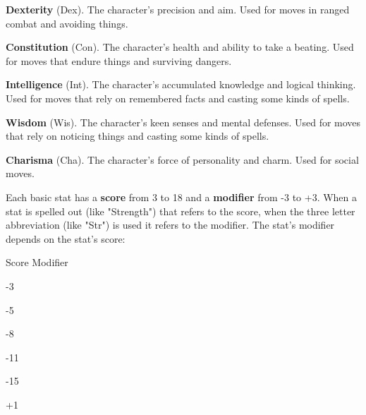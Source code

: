  

{\bf Dexterity}  (Dex). The character's precision and aim. Used for moves in ranged combat and avoiding things.

 

{\bf Constitution}  (Con). The character's health and ability to take a beating. Used for moves that endure things and surviving dangers.

 

{\bf Intelligence}  (Int). The character's accumulated knowledge and logical thinking. Used for moves that rely on remembered facts and casting some kinds of spells.

 

{\bf Wisdom}  (Wis). The character's keen senses and mental defenses. Used for moves that rely on noticing things and casting some kinds of spells.

 

{\bf Charisma}  (Cha). The character's force of personality and charm. Used for social moves.

 

Each basic stat has a {\bf score}  from 3 to 18 and a {\bf modifier}  from -3 to +3. When a stat is spelled out (like "Strength") that refers to the score, when the three letter abbreviation (like "Str") is used it refers to the modifier. The stat's modifier depends on the stat's score:

\bTABLE
 		
\bTR
\bTH
 			Score 			
\eTH
\bTH
Modifier
\eTH
 		
\eTR
 		
\bTR

-3
\eTD

\eTD

\eTR
 		
\bTR

-5
\eTD

\eTD

\eTR
 		
\bTR

-8
\eTD

\eTD

\eTR
 		
\bTR

-11
\eTD

\eTD

\eTR
 		
\bTR

-15
\eTD

\bTD
+1
\eTD


